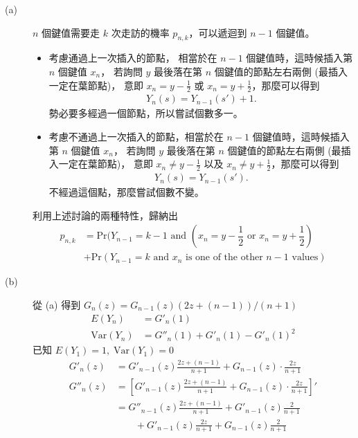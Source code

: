 \documentclass[11pt,fleqn]{article}
\begin{document}
\begin{description}
	\item[(a)] $n$ 個鍵值需要走 $k$ 次走訪的機率 $p_{n,k}$，可以遞迴到 $n-1$ 個鍵值。
		\begin{itemize}
			\item 考慮通過上一次插入的節點，
				相當於在 $n-1$ 個鍵值時，這時候插入第 $n$ 個鍵值 $x_n$，
				若詢問 $y$ 最後落在第 $n$ 個鍵值的節點左右兩側 (最插入一定在葉節點)，
				意即 $x_n = y - \frac{1}{2}$ 或 $x_n = y + \frac{1}{2}$，那麼可以得到 
				\begin{align*}
					Y_n(s) = Y_{n-1}(s') + 1.
				\end{align*}
				勢必要多經過一個節點，所以嘗試個數多一。
			\item 考慮不通過上一次插入的節點，相當於在 $n-1$ 個鍵值時，這時候插入第 $n$ 個鍵值 $x_n$，
				若詢問 $y$ 最後落在第 $n$ 個鍵值的節點左右兩側 (最插入一定在葉節點)，
				意即 $x_n \neq y - \frac{1}{2}$ 以及 $x_n \neq y + \frac{1}{2}$，那麼可以得到 
				\begin{align*}
					Y_n(s) = Y_{n-1}(s').
				\end{align*}
				不經過這個點，那麼嘗試個數不變。
		\end{itemize}
		利用上述討論的兩種特性，歸納出
		\begin{align*}
			p_{n,k} &= \text{Pr}(Y_{n-1} = k-1 \text{ and } (x_n = y - \dfrac{1}{2} \text{ or } x_n = y + \dfrac{1}{2}) \\
					& + \text{Pr}(Y_{n-1} = k \text{ and } x_n \text{ is one of the other } n-1 \text{ values}) 
		\end{align*}
	\item[(b)] 從 (a) 得到 $G_n(z) = G_{n-1}(z) (2 z + (n-1)) / (n+1)$
		\begin{align*}
			E(Y_n) &= {G}'_n(1) \\
			\text{Var}(Y_n) &= {G}''_n(1) + {G}'_n(1) - {G}'_n(1)^2
		\end{align*}
		已知 $E(Y_1) = 1, \; \text{Var}(Y_1) = 0$
		\begin{align*}
			{G}'_n(z) &= {G}'_{n-1}(z) \frac{2z + (n-1)}{n+1} + G_{n-1}(z) \cdot \frac{2z}{n+1} \\
			{G}''_n(z) &= \left[ {G}'_{n-1}(z) \frac{2z + (n-1)}{n+1} + G_{n-1}(z) \cdot \frac{2z}{n+1} \right]' \\
				&= {G}''_{n-1}(z)\frac{2z + (n-1)}{n+1} + {G}'_{n-1}(z) \frac{2}{n+1} \\
				& \qquad + {G}'_{n-1}(z)\frac{2z}{n+1} + G_{n-1}(z) \frac{2}{n+1} \\
		\end{align*}

\end{description}
\end{document}
